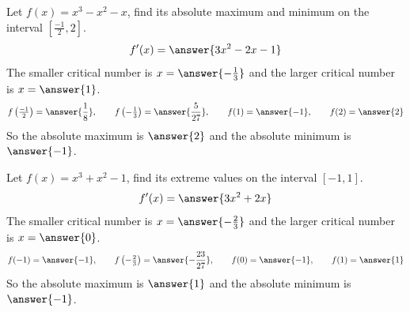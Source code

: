 \documentclass{ximera}
\begin{document}
\begin{example}\label{example:9-8}
Let $f(x)=x^{3}-x^{2}-x$, find its absolute maximum and minimum on the interval $\left[\frac{-1}{2}, 2\right]$.
\[
f^{\prime}(x)=\answer{3x^{2}-2x-1}
\]
The smaller critical number is $x=\answer{-\frac{1}{3}}$ and the larger critical number is $x=\answer{1}$.
\[
f\left(\tfrac{-1}{2}\right)=\answer{\frac{1}{8}}, \qquad f\left(-\tfrac{1}{3}\right)=\answer{\frac{5}{27}}, \qquad f(1)=\answer{-1}, \qquad f(2)=\answer{2}
\]
So the absolute maximum is $\answer{2}$ and the absolute minimum is $\answer{-1}$.
\end{example}

\begin{exercise}\label{exercise:9-9}
Let $f(x)=x^{3}+x^{2}-1$, find its extreme values on the interval $[-1, 1]$.
\[
f^{\prime}(x)=\answer{3x^{2}+2x}
\]
The smaller critical number is $x=\answer{-\frac{2}{3}}$ and the larger critical number is $x=\answer{0}$.
\[
f(-1)=\answer{-1}, \qquad f\left(-\tfrac{2}{3}\right)=\answer{-\frac{23}{27}}, \qquad f(0)=\answer{-1}, \qquad f(1)=\answer{1}
\]
So the absolute maximum is $\answer{1}$ and the absolute minimum is $\answer{-1}$.
\end{exercise}
\end{document}
